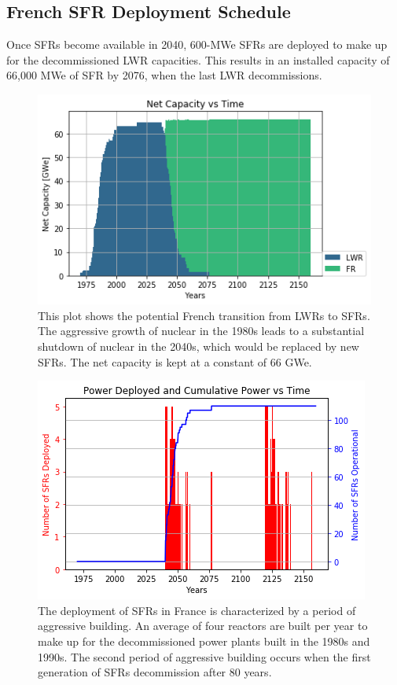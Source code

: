 \subsection{French \gls{SFR} Deployment Schedule}

Once \glspl{SFR} become available in 2040,
600-MWe \glspl{SFR} are deployed to make up for the 
decommissioned \gls{LWR} capacities. 
This results in an installed capacity of 66,000 MWe
of \gls{SFR} by 2076, when the last \gls{LWR} decommissions.

\begin{figure}[htbp!]
        \begin{center}
                \includegraphics[scale=0.6]{./images/french-transition/power_plot.png}
        \end{center}
        \caption{This plot shows the potential French transition from \glspl{LWR} to \glspl{SFR}.
				 The aggressive growth of nuclear in the 1980s leads to a substantial shutdown
				 of nuclear in the 2040s, which would be replaced by new \glspl{SFR}. The net
				 capacity is kept at a constant of 66 GWe.}
        \label{fig:sfr_num}
\end{figure}
\begin{figure}[htbp!]
	\begin{center}
		\includegraphics[scale=0.6]{./images/french-transition/sfr_deploy.png}
	\end{center}
	\caption{The deployment of \glspl{SFR} in France is characterized by a period of
		     aggressive building. An average of four reactors are built per year to
		     make up for the decommissioned power plants built in the 1980s and 1990s.
		     The second period of aggressive building occurs when the first generation
		     of \glspl{SFR} decommission after 80 years.}
	\label{fig:dep}
\end{figure}
\FloatBarrier


